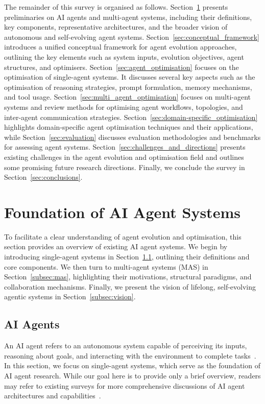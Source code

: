 \documentclass[]{selfevolagent}
\theoremstyle{plain}
\theoremstyle{definition}
\theoremstyle{remark}
\begin{document}
The remainder of this survey is organised as follows. 
Section~\ref{sec:preliminaries} presents preliminaries on AI agents and multi-agent systems, including their definitions, key components, representative architectures, and the broader vision of autonomous and self-evolving agent systems. 
Section~\ref{sec:conceptual_framework} introduces a unified conceptual framework for agent evolution approaches, outlining the key elements such as system inputs, evolution objectives, agent structures, and optimisers. 
Section~\ref{sec:agent_optimisation} focuses on the optimisation of single-agent systems. It discusses several key aspects such as the optimisation of reasoning strategies, prompt formulation, memory mechanisms, and tool usage. 
Section~\ref{sec:multi_agent_optimisation} focuses on multi-agent systems and review methods for optimising agent workflows, topologies, and inter-agent communication strategies. 
Section~\ref{sec:domain-specific_optimisation} highlights domain-specific agent optimisation techniques and their applications, while Section~\ref{sec:evaluation} discusses evaluation methodologies and benchmarks for assessing agent systems. Section~\ref{sec:challenges_and_directions} presents existing challenges in the agent evolution and optimisation field and outlines some promising future research directions. Finally, we conclude the survey in Section~\ref{sec:conclusions}. 



\section{Foundation of AI Agent Systems}
\label{sec:preliminaries} 
To facilitate a clear understanding of agent evolution and optimisation, this section provides an overview of existing AI agent systems. We begin by introducing single-agent systems in Section~\ref{subsec:sas}, outlining their definitions and core components. 
We then turn to multi-agent systems (MAS) in Section~\ref{subsec:mas}, highlighting their motivations, structural paradigms, and collaboration mechanisms. Finally, we present the vision of lifelong, self-evolving agentic systems in Section~\ref{subsec:vision}. 

\subsection{AI Agents}
\label{subsec:sas}
An AI agent refers to an autonomous system capable of perceiving its inputs, reasoning about goals, and interacting with the environment to complete tasks~\citep{luo2025large}. In this section, we focus on single-agent systems, which serve as the foundation of AI agent research. While our goal here is to provide only a brief overview, readers may refer to existing surveys for more comprehensive discussions of AI agent architectures and capabilities~\citep{guo2024large,xi2025the,luo2025large,liu2025advances}. 
\end{document}
